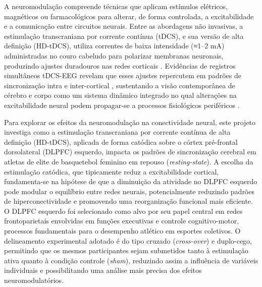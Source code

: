 A neuromodulação compreende técnicas que aplicam estímulos elétricos, magnéticos ou farmacológicos para alterar, de forma controlada, a excitabilidade e a comunicação entre circuitos neurais. Entre as abordagens não invasivas, a estimulação transcraniana por corrente contínua (tDCS), e sua versão de alta definição (HD-tDCS), utiliza correntes de baixa intensidade (≈1–2 mA) administradas no couro cabeludo para polarizar membranas neuronais, produzindo ajustes duradouros nas redes corticais \cite{nitsche2000excitability,stagg2011physiological}. Evidências de registros simultâneos tDCS-EEG revelam que esses ajustes repercutem em padrões de sincronização intra e inter-cortical \cite{kunze2014high}, sustentando a visão contemporânea de cérebro e corpo como um sistema dinâmico integrado no qual alterações na excitabilidade neural podem propagar-se a processos fisiológicos periféricos \cite{criscuolo2022cognition}.

Para explorar os efeitos da neuromodulação na conectividade neural, este projeto investiga como a estimulação transcraniana por corrente contínua de alta definição (HD-tDCS), aplicada de forma catódica sobre o córtex pré-frontal dorsolateral (DLPFC) esquerdo, impacta os padrões de sincronização cerebral em atletas de elite de basquetebol feminino em repouso (\textit{resting-state}). A escolha da estimulação catódica, que tipicamente reduz a excitabilidade cortical, fundamenta-se na hipótese de que a diminuição da atividade no DLPFC esquerdo pode modular o equilíbrio entre redes neurais, potencialmente reduzindo padrões de hiperconectividade e promovendo uma reorganização funcional mais eficiente. O DLPFC esquerdo foi selecionado como alvo por seu papel central em redes frontoparietais envolvidas em funções executivas e controle cognitivo-motor, processos fundamentais para o desempenho atlético em esportes coletivos. O delineamento experimental adotado é do tipo cruzado (\textit{cross-over}) e duplo-cego, permitindo que os mesmos participantes sejam submetidos tanto à estimulação ativa quanto à condição controle (\textit{sham}), reduzindo assim a influência de variáveis individuais e possibilitando uma análise mais precisa dos efeitos neuromodulatórios.

